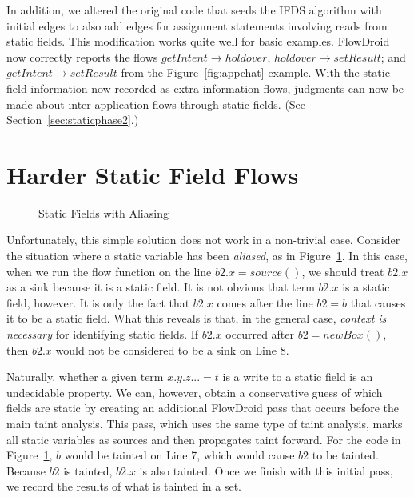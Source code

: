 In addition, we altered the original code that seeds the IFDS algorithm with initial edges to also add edges for assignment statements involving reads from static fields. This modification works quite well for basic examples. FlowDroid now correctly reports the flows $getIntent\rightarrow holdover$, $holdover\rightarrow setResult$; and $getIntent\rightarrow setResult$ from the Figure~\ref{fig:appchat} example. With the static field information now recorded as extra information flows, judgments can now be made about inter-application flows through static fields. (See Section~\ref{sec:staticphase2}.)

\section{Harder Static Field Flows}

\begin{figure}
\begin{framed}
\begin{center}
\begin{minipage}{0.85\textwidth}

\end{minipage}
\end{center}
\caption{Static Fields with Aliasing}
\label{fig:aliased}
\end{framed}
\end{figure}

Unfortunately, this simple solution does not work in a non-trivial case. Consider the situation where a static variable has been \emph{aliased}, as in Figure~\ref{fig:aliased}. In this case, when we run the flow function on the line $\mathit{b2}.x = source()$, we should treat $\mathit{b2}.x$ as a sink because it is a static field. It is not obvious that term $\mathit{b2}.x$ is a static field, however. It is only the fact that $\mathit{b2}.x$ comes after the line $\mathit{b2} = b$ that causes it to be a static field. What this reveals is that, in the general case, \emph{context is necessary} for identifying static fields. If $\mathit{b2}.x$ occurred after $\mathit{b2} = new Box()$, then $\mathit{b2}.x$ would not be considered to be a sink on Line 8.

Naturally, whether a given term $x.y.z... = t$ is a write to a static field is an undecidable property. We can, however, obtain a conservative guess of which fields are static by creating an additional FlowDroid pass that occurs before the main taint analysis. This pass, which uses the same type of taint analysis, marks all static variables as sources and then propagates taint forward. For the code in Figure~\ref{fig:aliased}, $b$ would be tainted on Line 7, which would cause $\mathit{b2}$ to be tainted. Because $\mathit{b2}$ is tainted, $\mathit{b2}.x$ is also tainted. Once we finish with this initial pass, we record the results of what is tainted in a set.

